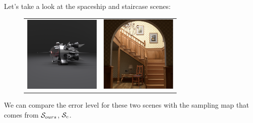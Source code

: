 \documentclass{classeENS}
\begin{document}
Let's take a look at the spaceship and staircase scenes:
\begin{figure}[H]
    \centering
    \begin{tabular}{cc}
    \includegraphics[width=37mm]{image/final/gt.png}&
    \includegraphics[width=37mm]{image/final2/gt.png}
    \end{tabular}
\end{figure}

We can compare the error level for these two scenes with the sampling map that comes from $\mathcal S_{ours}$, $\mathcal S_{c}$.
\end{document}

